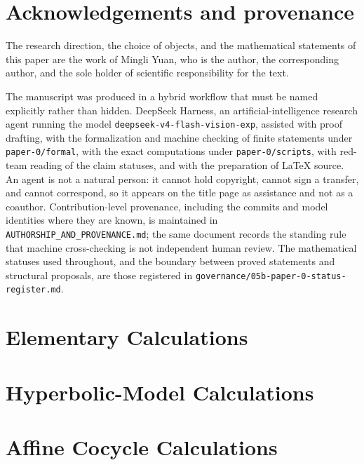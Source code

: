 \documentclass[11pt]{article}
\theoremstyle{definition}
\theoremstyle{remark}
\begin{document}
\section*{Acknowledgements and provenance}
The research direction, the choice of objects, and the mathematical statements
of this paper are the work of Mingli Yuan, who is the author, the corresponding
author, and the sole holder of scientific responsibility for the text.

The manuscript was produced in a hybrid workflow that must be named explicitly
rather than hidden.  DeepSeek Harness, an artificial-intelligence research agent
running the model \texttt{deepseek-v4-flash-vision-exp}, assisted with proof
drafting, with the formalization and machine checking of finite statements under
\texttt{paper-0/formal}, with the exact computations under
\texttt{paper-0/scripts}, with red-team reading of the claim statuses, and with
the preparation of \LaTeX{} source.  An agent is not a natural person: it cannot
hold copyright, cannot sign a transfer, and cannot correspond, so it appears on
the title page as assistance and not as a coauthor.  Contribution-level
provenance, including the commits and model identities where they are known, is
maintained in \texttt{AUTHORSHIP\_AND\_PROVENANCE.md}; the same document records
the standing rule that machine cross-checking is not independent human review.
The mathematical statuses used throughout, and the boundary between proved
statements and structural proposals, are those registered in
\texttt{governance/05b-paper-0-status-register.md}.

\appendix
\section{Elementary Calculations}\label{app:p0-calculations}


\section{Hyperbolic-Model Calculations}\label{app:p0-hyperbolic}


\section{Affine Cocycle Calculations}\label{app:p0-affine-cocycles}

\end{document}
